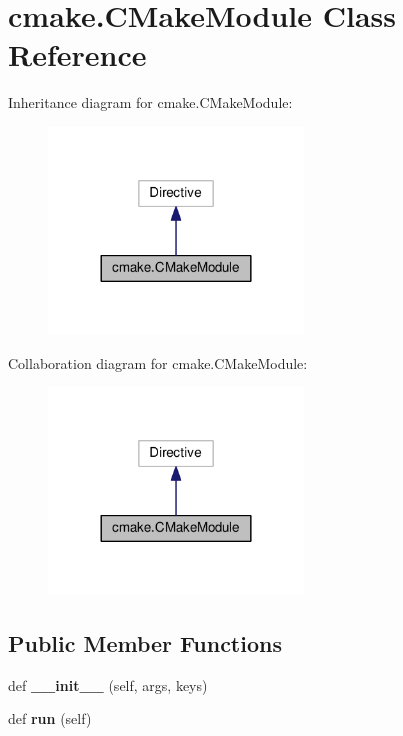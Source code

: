 \hypertarget{classcmake_1_1CMakeModule}{}\section{cmake.\+C\+Make\+Module Class Reference}
\label{classcmake_1_1CMakeModule}


Inheritance diagram for cmake.\+C\+Make\+Module\+:
\nopagebreak
\begin{figure}[H]
\begin{center}
\leavevmode
\includegraphics[width=192pt]{classcmake_1_1CMakeModule__inherit__graph}
\end{center}
\end{figure}


Collaboration diagram for cmake.\+C\+Make\+Module\+:
\nopagebreak
\begin{figure}[H]
\begin{center}
\leavevmode
\includegraphics[width=192pt]{classcmake_1_1CMakeModule__coll__graph}
\end{center}
\end{figure}
\subsection*{Public Member Functions}
\begin{DoxyCompactItemize}
\item 
def {\bfseries \+\_\+\+\_\+init\+\_\+\+\_\+} (self, args, keys)\hypertarget{classcmake_1_1CMakeModule_a42d2e41b69c92d05ff380fa12a5ff9c5}{}\label{classcmake_1_1CMakeModule_a42d2e41b69c92d05ff380fa12a5ff9c5}

\item 
def {\bfseries run} (self)\hypertarget{classcmake_1_1CMakeModule_a08741d315b312c41742816b16b8bfcef}{}\label{classcmake_1_1CMakeModule_a08741d315b312c41742816b16b8bfcef}

\end{DoxyCompactItemize}
